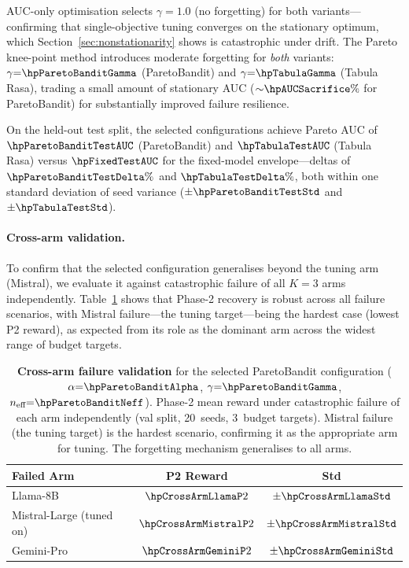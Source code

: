 AUC-only optimisation selects $\gamma{=}1.0$ (no forgetting) for
both variants---confirming that single-objective tuning converges
on the stationary optimum, which
Section~\ref{sec:nonstationarity} shows is catastrophic under drift.
The Pareto knee-point method introduces moderate forgetting for
\emph{both} variants: $\gamma{=}\hpParetoBanditGamma$ (ParetoBandit)
and $\gamma{=}\hpTabulaGamma$ (Tabula Rasa), trading a small amount
of stationary AUC (${\sim}\hpAUCSacrifice\%$ for ParetoBandit) for
substantially improved failure resilience.

On the held-out test split, the selected configurations achieve
Pareto AUC of $\hpParetoBanditTestAUC$ (ParetoBandit) and
$\hpTabulaTestAUC$ (Tabula Rasa) versus $\hpFixedTestAUC$ for the
fixed-model envelope---deltas of $\hpParetoBanditTestDelta\%$ and
$\hpTabulaTestDelta\%$, both within one standard deviation of
seed variance ($\pm\hpParetoBanditTestStd$ and
$\pm\hpTabulaTestStd$).

\paragraph{Cross-arm validation.}
To confirm that the selected configuration generalises beyond the
tuning arm (Mistral), we evaluate it against catastrophic failure
of all $K{=}3$ arms independently.
Table~\ref{tab:cross_arm_validation} shows that Phase-2 recovery
is robust across all failure scenarios, with Mistral failure---the
tuning target---being the hardest case (lowest P2 reward), as
expected from its role as the dominant arm across the widest range
of budget targets.

\begin{table}[t]
\centering
\caption{%
  \textbf{Cross-arm failure validation} for the selected
  ParetoBandit configuration
  ($\alpha{=}\hpParetoBanditAlpha$,
   $\gamma{=}\hpParetoBanditGamma$,
   $n_{\text{eff}}{=}\hpParetoBanditNeff$).
  Phase-2 mean reward under catastrophic failure of each arm
  independently (val split, 20~seeds, 3~budget targets).
  Mistral failure (the tuning target) is the hardest scenario,
  confirming it as the appropriate arm for tuning.
  The forgetting mechanism generalises to all arms.%
}
\label{tab:cross_arm_validation}
\small
\begin{tabular}{@{}lcc@{}}
\toprule
\textbf{Failed Arm} & \textbf{P2 Reward} & \textbf{Std} \\
\midrule
Llama-8B             & $\hpCrossArmLlamaP2$   & $\pm\hpCrossArmLlamaStd$ \\
Mistral-Large (tuned on) & $\hpCrossArmMistralP2$ & $\pm\hpCrossArmMistralStd$ \\
Gemini-Pro           & $\hpCrossArmGeminiP2$  & $\pm\hpCrossArmGeminiStd$ \\
\bottomrule
\end{tabular}
\end{table}

